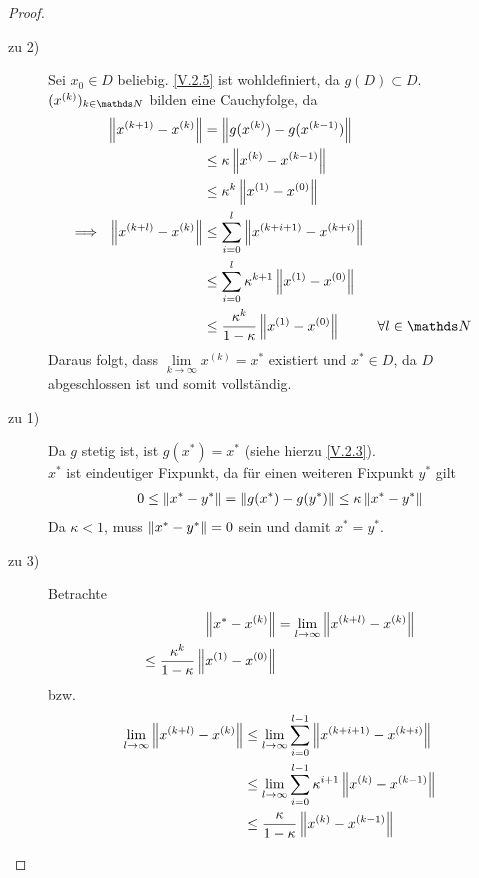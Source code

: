 \begin{proof}
  \begin{description}
  \item[zu 2)] Sei $x_0\in D$ beliebig. \eqref{V.2.5} ist wohldefiniert, da $g(D)\subset D$.
    $(x^{(k)})_{k\in\N}$ bilden eine Cauchyfolge, da 
    \begin{align*}
      \nn{x^{(k+1)}-x^{(k)}} &= \nn{g(x^{(k)})-g(x^{(k-1)})} \\
                             &\leq \kappa \nn{x^{(k)}-x^{(k-1)}} \\
                             &\leq \kappa^k\nn{x^{(1)}-x^{(0)}} \\
      \Longrightarrow~~ \nn{x^{(k+l)}-x^{(k)}} &\leq \sum_{i=0}^{l}\nn{x^{(k+i+1)}-x^{(k+i)}} \\
                             &\leq \sum_{i=0}^{l}\kappa^{k+1}\nn{x^{(1)}-x^{(0)}}\\
                             &\leq \frac{\kappa^k}{1-\kappa}\nn{x^{(1)}-x^{(0)}}
                             &&\forall l\in\N 
    \end{align*}
    Daraus folgt, dass $\lim\limits_{k\rightarrow \infty} x^{(k)}=x^{*} $ existiert 
    und $x^{*}\in D$, da $D$ abgeschlossen ist und somit vollständig.
    
  \item[zu 1)] Da $g$ stetig ist, ist $g(x^{*})=x^{*}$ (siehe hierzu \eqref{V.2.3}). \\
    $x^{*}	$ ist eindeutiger Fixpunkt, da für einen weiteren Fixpunkt $y^{*}$ gilt
    \begin{gather*}
      0\leq \left\| x^{*}-y^{*} \right\| = \left\| g(x^{*})-g(y^{*}) \right\|\leq \kappa \left\| x^{*}-y^{*} \right\|
    \end{gather*}
    Da $\kappa<1$, muss $ \left\| x^{*}-y^{*} \right\|=0$ sein und damit $x^{*}=y^{*}$.
    
  \item[zu 3)] Betrachte 
    \begin{align*}
      \left\| x^{*}-x^{(k)} \right\| &= \lim\limits_{l\rightarrow \infty} \left\| x^{(k+l)}-x^{(k)} \right\| \\
      \leq  \frac{\kappa^k}{1-\kappa} \left\| x^{(1)}- x^{(0)} \right\|
    \end{align*}
    bzw.
    \begin{align*}
      \lim\limits_{l\rightarrow \infty} \left\| x^{(k+l)}-x^{(k)} \right\|
      &\leq \lim\limits_{l\rightarrow \infty} \sum_{i=0}^{l-1}\left\| x^{(k+i+1)}-x^{(k+i)} \right\| \\
      &\leq \lim\limits_{l\rightarrow \infty}\sum_{i=0}^{l-1}\kappa^{i+1} \left\| x^{(k)}-x^{(k-1)} \right\| \\
      &\leq \frac{\kappa}{1-\kappa} \left\| x^{(k)}-x^{(k-1)} \right\| 
    \end{align*}
  \end{description}
\end{proof}

